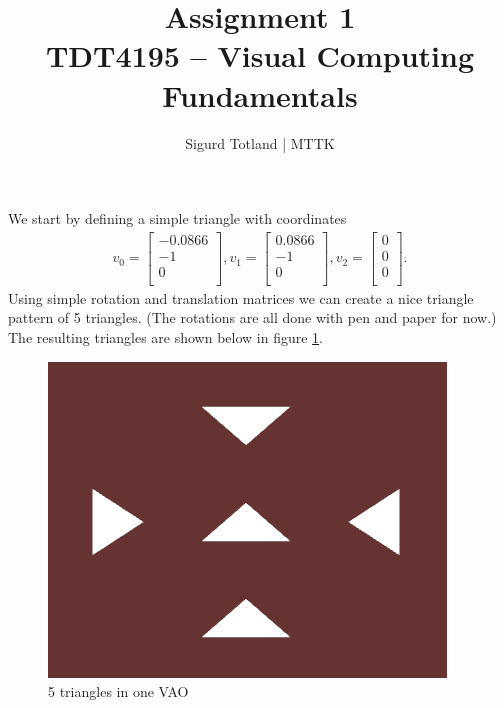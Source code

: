 \documentclass[]{article}
\title{\Huge{Assignment 1} \\ \Large{TDT4195 – Visual Computing Fundamentals}}
\author{Sigurd Totland | MTTK}
\begin{document}
\maketitle
\begin{multicols}{2}
\section{}
\setcounter{subsection}{2}
\subsection{}
We start by defining a simple triangle with coordinates
\begin{equation}\begin{aligned}
v_0 =
\begin{bmatrix}
-0.0866 \\
-1 \\
0 \\
\end{bmatrix},
v_1 =
\begin{bmatrix}
0.0866 \\
-1 \\
0 \\
\end{bmatrix},
v_2 =
\begin{bmatrix}
0 \\
0 \\
0 \\
\end{bmatrix}.
\end{aligned}\end{equation}
Using simple rotation and translation matrices we can create a nice triangle pattern of 5 triangles. (The rotations are all done with pen and paper for now.) The resulting triangles are shown below in figure \ref{fig:5tris}.
\begin{figure}[H]
\centering
\includegraphics[width=0.5\columnwidth]{5tris.png}
\caption{5 triangles in one VAO}
\label{fig:5tris}
\end{figure}


\end{multicols}
\end{document}
